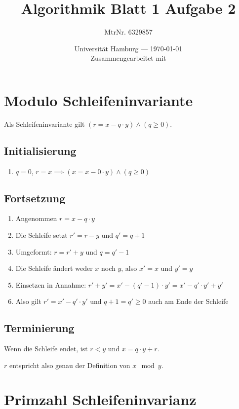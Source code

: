 \documentclass[parskip=half,a4paper]{scrartcl}
\title{Algorithmik Blatt 1 Aufgabe 2}
\author{MtrNr. 6329857}
\date{Universität Hamburg --- \today \\ Zusammengearbeitet mit}
\begin{document}
\maketitle

\section*{Modulo Schleifeninvariante}

Als Schleifeninvariante gilt $(r = x - q \cdot y) \land (q \ge 0)$.

\subsection*{Initialisierung}

\begin{enumerate}
	\item $q = 0$, $r = x \implies (x = x - 0 \cdot y) \land (q \ge 0)$
\end{enumerate}

\subsection*{Fortsetzung}

\begin{enumerate}
	\item Angenommen $r = x - q \cdot y$
	\item Die Schleife setzt $r' = r - y$ und $q' = q + 1$
	\item Umgeformt: $r = r' + y$ und $q = q' - 1$
	\item Die Schleife ändert weder $x$ noch $y$, also $x' = x$ und $y' = y$
	\item Einsetzen in Annahme: $r' + y' = x' - (q' - 1) \cdot y' = x' - q' \cdot y' + y'$
	\item Also gilt $r' = x' - q' \cdot y'$ und $q + 1 = q' \ge 0$ auch am Ende der Schleife
\end{enumerate}

\subsection*{Terminierung}

Wenn die Schleife endet, ist $r < y$ und $x = q \cdot y + r$.

$r$ entspricht also genau der Definition von $x \mod y$.

\section*{Primzahl Schleifeninvarianz}
\end{document}
